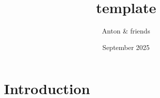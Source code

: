 \documentclass{article}
\title{template}
\author{Anton \& friends}
\date{September 2025}
\begin{document}
\maketitle
\tableofcontents

\section{Introduction}
\end{document}
